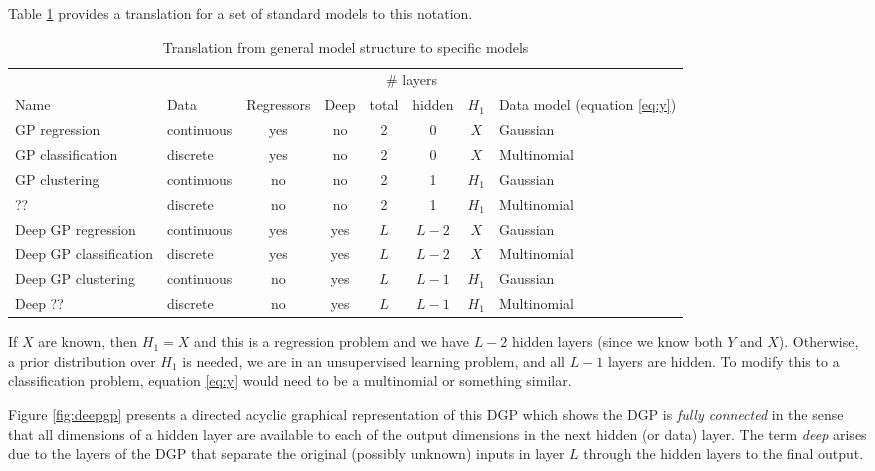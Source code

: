 \documentclass{article}
\newcommand{\1}{\mathbbm{1}}
\begin{document}
Table \ref{tab:translation} provides a translation for a set of standard models
to this notation.
\begin{table}[htb]
\begin{minipage}{0.85\textwidth}
\caption{Translation from general model structure to specific models}
\vspace{1pt}
\end{minipage}
\label{tab:translation}
\centering
\begin{tabular}{l|lcc|cc|cl}
\hline
& \multicolumn{3}{c|}{} & \multicolumn{2}{c|}{\# layers} \\
Name & Data & Regressors & Deep & total & hidden & $H_1$ & Data model (equation \ref{eq:y}) \\
\hline
GP regression     & continuous & yes & no & 2 & 0 & $X$ & Gaussian \\
GP classification & discrete   & yes & no & 2 & 0 & $X$ & Multinomial \\
GP clustering     & continuous & no  & no & 2 & 1 & $H_1$ & Gaussian \\
??                & discrete   & no  & no & 2 & 1 & $H_1$ & Multinomial \\
\hline
Deep GP regression     & continuous & yes & yes & $L$ & $L-2$ & $X$ & Gaussian \\
Deep GP classification & discrete   & yes & yes & $L$ & $L-2$ & $X$ & Multinomial \\
Deep GP clustering     & continuous & no  & yes & $L$ & $L-1$ & $H_1$ & Gaussian \\
Deep ??                & discrete   & no  & yes & $L$ & $L-1$ & $H_1$ & Multinomial \\
\hline
\end{tabular}
\end{table}
If $X$ are known, then $H_1 = X$ and this is a regression problem and we have
$L-2$ hidden layers (since we know both $Y$ and $X$).
Otherwise, a prior distribution over $H_1$ is needed, we are in an
unsupervised learning problem, and all $L-1$ layers are hidden.
To modify this to a classification problem, equation \eqref{eq:y} would need to
be a multinomial or something similar.

Figure \ref{fig:deepgp} presents a directed acyclic graphical representation
of this DGP which shows the DGP is \emph{fully connected} in the sense that all
dimensions of a hidden layer are available to each of the output dimensions
in the next hidden (or data) layer.
The term \emph{deep} arises due to the layers of the DGP that separate
the original (possibly unknown) inputs in layer $L$ through the hidden layers
to the final output. 

\end{document}

